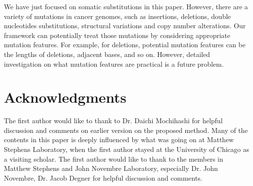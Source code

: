 We have just focused on somatic substitutions in this paper.
However, there are a variety of mutations in cancer genomes, 
such as insertions, deletions, double nucleotides substitutions, structural variations and copy number alterations.
Our framework can potentially treat those mutations by considering appropriate mutation features.
For example, for deletions, potential mutation features can be the lengths of deletions, adjacent bases, and so on.
However, detailed investigation on what mutation features are practical is a future problem.





\section*{Acknowledgments}

The first author would like to thank to Dr. Daichi Mochihashi for helpful discussion and comments on earlier version on the proposed method.
Many of the contents in this paper is deeply influenced by what was going on at Matthew Stephens Laboratory,
when the first author stayed at the University of Chicago as a visiting scholar.
The first author would like to thank to the members in Matthew Stephens and John Novembre Laboratory, especially Dr. John Novembre,
Dr. Jacob Degner for helpful discussion and comments.


%
%
% 

% 




%

